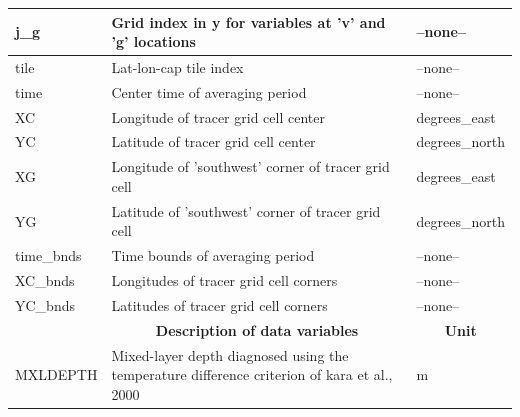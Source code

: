 \begin{longtable}{|m{}|m{}|m{}|}
j\_g &Grid index in y for variables at 'v' and 'g' locations &--none--  \\ \hline
tile &Lat-lon-cap tile index &--none--  \\ \hline
time &Center time of averaging period &--none--  \\ \hline
XC &Longitude of tracer grid cell center &degrees\_east  \\ \hline
YC &Latitude of tracer grid cell center &degrees\_north  \\ \hline
XG &Longitude of 'southwest' corner of tracer grid cell &degrees\_east  \\ \hline
YG &Latitude of 'southwest' corner of tracer grid cell &degrees\_north  \\ \hline
time\_bnds &Time bounds of averaging period &--none--  \\ \hline
XC\_bnds &Longitudes of tracer grid cell corners &--none--  \\ \hline
YC\_bnds &Latitudes of tracer grid cell corners &--none--  \\ \hline
\rowcolor{lightgray} \multicolumn{1}{|c|}{\textbf{Variables}} & \multicolumn{1}{|c|}{\textbf{Description of data variables}} &  \multicolumn{1}{|c|}{\textbf{Unit}}\\ \hline
MXLDEPTH &Mixed-layer depth diagnosed using the temperature difference criterion of kara et al., 2000 &m  \\ \hline
\end{longtable}

\newp
\pagebreak
